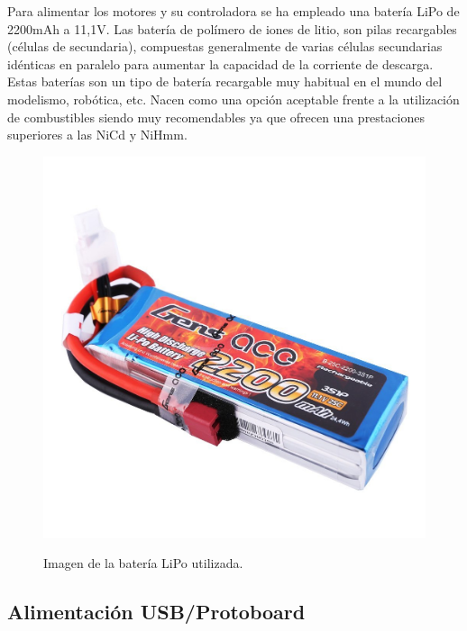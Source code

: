 Para alimentar los motores y su controladora se ha empleado una batería LiPo de 2200mAh a 11,1V. Las batería de polímero de iones de litio, son pilas recargables (células de secundaria), compuestas generalmente 
de varias células secundarias idénticas en paralelo para aumentar la capacidad de la corriente de descarga. \\

Estas baterías son un tipo de batería recargable muy habitual en el mundo del modelismo, robótica, etc.  Nacen como una opción aceptable frente a la utilización
de combustibles siendo muy recomendables ya que ofrecen una prestaciones superiores a las NiCd y NiHmm.\\

\begin{figure}[H]
  \begin{center}
    \includegraphics[scale=0.2]{imagenes/robot/bateria.jpg}\\
    \caption{Imagen de la batería LiPo utilizada.}
  \end{center}
\end{figure}

\subsection{ Alimentación USB/Protoboard }

